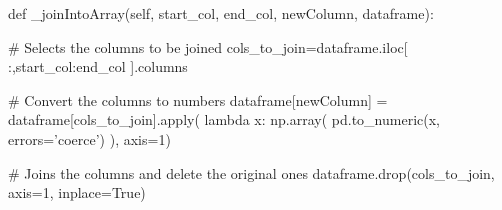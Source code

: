 def _joinIntoArray(self, start_col, end_col, newColumn, dataframe):

 # Selects the columns to be joined
 cols_to_join=dataframe.iloc[
 	:,start_col:end_col
 	].columns
 
 # Convert the columns to numbers
 dataframe[newColumn] = dataframe[cols_to_join].apply(
 	lambda x: np.array(
 		pd.to_numeric(x, errors='coerce')
 	), axis=1)
 
 # Joins the columns and delete the original ones
 dataframe.drop(cols_to_join, axis=1, inplace=True)